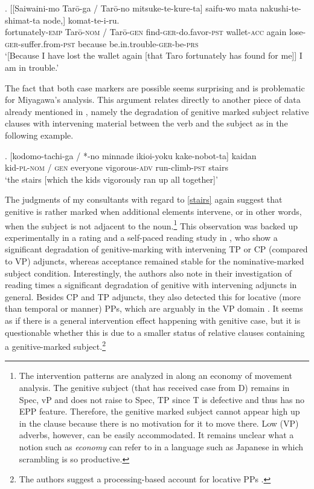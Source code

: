 \exg. [[Saiwaini-mo Tarō-ga / Tarō-no mitsuke-te-kure-ta] saifu-wo mata nakushi-te-shimat-ta node,] komat-te-i-ru.\\
fortunately-\textsc{emp} Tarō-\textsc{nom} / Tarō-\textsc{gen} find-\textsc{ger}-do.favor-\textsc{pst} wallet-\textsc{acc} again lose-\textsc{ger}-suffer.from-\textsc{pst} because be.in.trouble-\textsc{ger}-be-\textsc{prs}\\
`[Because I have lost the wallet again [that Taro fortunately has found for me]] I am in trouble.' \label{wallet}

The fact that both case markers are possible seems surprising and is problematic for Miyagawa's analysis. This argument relates directly to another piece of data already mentioned in \citet{harada:1971:ga}, namely the degradation of genitive marked subject relative clauses with intervening material between the verb and the subject as in the following example.

\exg. [kodomo-tachi-ga / *-no minnade ikioi-yoku kake-nobot-ta] kaidan\\
kid-\textsc{pl}-\textsc{nom} / \textsc{gen} everyone vigorous-\textsc{adv} run-climb-\textsc{pst} stairs\\
`the stairs [which the kids vigorously ran up all together]’ \\ \null \hfill \citep[30]{harada:1971:ga} \label{stairs}

The judgments of my consultants with regard to \ref{stairs} again suggest that genitive is rather marked when additional elements intervene, or in other words, when the subject is not adjacent to the noun.\footnote{The intervention patterns are analyzed in \citet[§ 4.2]{miyagawa:2011:genitive} along an economy of movement analysis. The genitive subject (that has received case from D) remains in Spec, vP and does not raise to Spec, TP since T is defective and thus has no EPP feature. Therefore, the genitive marked subject cannot appear high up in the clause because there is no motivation for it to move there. Low (VP) adverbs, however, can be easily accommodated. It remains unclear what a notion such as \textit{economy} can refer to in a language such as Japanese in which scrambling is so productive.} This observation was backed up experimentally in a rating and a self-paced reading study in \citet{nambu:2014:an, nambu:2023:experimental}, who show a significant degradation of genitive-marking with intervening TP or CP (compared to VP) adjuncts, whereas acceptance remained stable for the nominative-marked subject condition. Interestingly, the authors also note in their investigation of reading times a significant degradation of genitive with intervening adjuncts in general. Besides CP and TP adjuncts, they also detected this for locative (more than temporal or manner) PPs, which are arguably in the VP domain \citep[15–23]{nambu:2023:experimental}. It seems as if there is a general intervention effect happening with genitive case, but it is questionable whether this is due to a smaller status of relative clauses containing a genitive-marked subject.\footnote{The authors suggest a processing-based account for locative PPs \citep[25]{nambu:2023:experimental}.}

